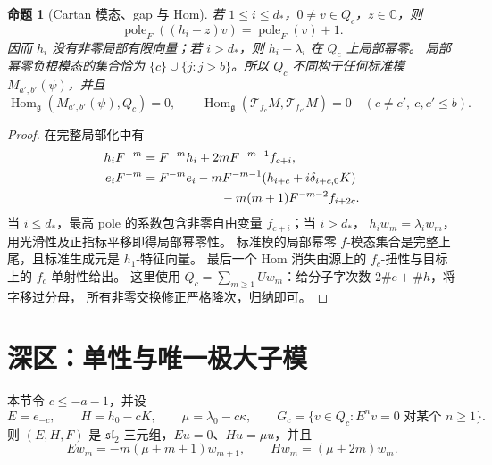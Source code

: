 \documentclass[UTF8,11pt,a4paper,fontset=fandol]{ctexart}
\theoremstyle{upright}
\newtheorem{proposition}[theorem]{命题}
\newcommand{\C}{\mathbb C}
\newcommand{\g}{\mathfrak g}
\newcommand{\slc}{\mathfrak{sl}_2}
\newcommand{\T}{\mathcal T}
\DeclareMathOperator{\Hom}{Hom}
\DeclareMathOperator{\pole}{pole}
\begin{document}
\begin{proposition}[Cartan 模态、gap 与 Hom]\label{prop:profiles}
若 $1\le i\le d_*$，$0\ne v\in Q_c$，$z\in\C$，则
\[
\pole_F((h_i-z)v)=\pole_F(v)+1.
\]
因而 $h_i$ 没有非零局部有限向量；若 $i>d_*$，则 $h_i-\lambda_i$ 在 $Q_c$ 上局部幂零。
局部幂零负根模态的集合恰为 $\{c\}\cup\{j:j>b\}$。所以 $Q_c$ 不同构于任何标准模
$M_{a',b'}(\psi)$，并且
\[
\Hom_\g(M_{a',b'}(\psi),Q_c)=0,
\qquad
\Hom_\g(\T_{f_c}M,\T_{f_{c'}}M)=0\quad(c\ne c',\ c,c'\le b).
\]
\end{proposition}
\begin{proof}
在完整局部化中有
\begin{equation}\label{eq:commutation}
\begin{aligned}
h_iF^{-m}&=F^{-m}h_i+2mF^{-m-1}f_{c+i},\\
e_iF^{-m}&=F^{-m}e_i-mF^{-m-1}(h_{i+c}+i\delta_{i+c,0}K)\\
&\hspace{22mm}-m(m+1)F^{-m-2}f_{i+2c}.
\end{aligned}
\end{equation}
当 $i\le d_*$，最高 pole 的系数包含非零自由变量 $f_{c+i}$；当 $i>d_*$，
$h_iw_m=\lambda_iw_m$，用光滑性及正指标平移即得局部幂零性。
标准模的局部幂零 $f$-模态集合是完整上尾，且标准生成元是 $h_1$-特征向量。
最后一个 Hom 消失由源上的 $f_c$-扭性与目标上的 $f_c$-单射性给出。
这里使用 $Q_c=\sum_{m\ge1}Uw_m$：给分子字次数 $2\#e+\#h$，将字移过分母，
所有非零交换修正严格降次，归纳即可。
\end{proof}

\section{深区：单性与唯一极大子模}

本节令 $c\le-a-1$，并设
\[
E=e_{-c},\qquad H=h_0-cK,\qquad \mu=\lambda_0-c\kappa,
\qquad G_c=\{v\in Q_c:E^nv=0\text{ 对某个 }n\ge1\}.
\]
则 $(E,H,F)$ 是 $\slc$-三元组，$Eu=0$、$Hu=\mu u$，并且
\begin{equation}\label{eq:pure}
Ew_m=-m(\mu+m+1)w_{m+1},\qquad Hw_m=(\mu+2m)w_m.
\end{equation}
\end{document}
